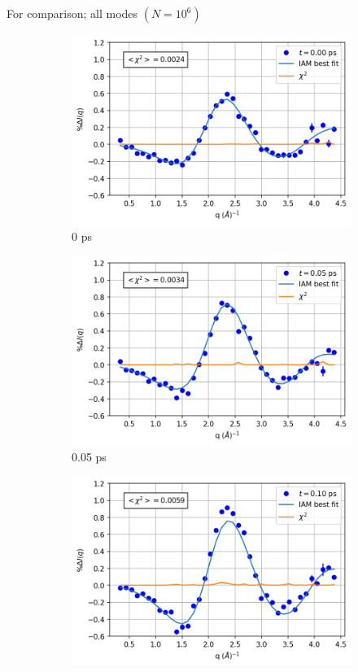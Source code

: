 \documentclass{beamer}
\newcommand\w{0.32}
\begin{document}
\begin{frame}{For comparison; all modes $(N= 10^6)$}
\begin{figure}
\begin{subfigure}[b]{\w\textwidth}
			\includegraphics[width=\textwidth]{figures/1000000_allmodes_0.00.png}
			\caption{0 ps}
		\end{subfigure}
		\begin{subfigure}[b]{\w\textwidth}
			\centering
			\includegraphics[width=\textwidth]{figures/1000000_allmodes_0.05.png}
			\caption{0.05 ps}
		\end{subfigure}
		\begin{subfigure}[b]{\w\textwidth}
			\centering
			\includegraphics[width=\textwidth]{figures/1000000_allmodes_0.10.png}

\end{subfigure}
\end{figure}
\end{frame}
\end{document}

